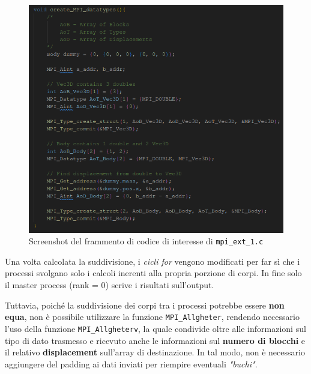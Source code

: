 \documentclass[12pt]{report}
\begin{document}
    \begin{figure}[H]
        \centering
        \includegraphics[width=\textwidth]{images/mpi_ext_1_2.png}
        \caption{Screenshot del frammento di codice di interesse di \texttt{mpi\_ext\_1.c}}
        \label{fig:mpi_ext_1_2}
    \end{figure}

    Una volta calcolata la suddivisione, i \textit{cicli for} vengono modificati per far sì che i processi svolgano solo i calcoli inerenti alla propria porzione di corpi. In fine solo il master process (rank = 0) scrive i risultati sull'output.

    Tuttavia, poiché la suddivisione dei corpi tra i processi potrebbe essere \textbf{non equa}, non è possibile utilizzare la funzione \texttt{MPI\_Allgheter}, rendendo necessario l'uso della funzione \texttt{MPI\_Allgheterv}, la quale condivide oltre alle informazioni sul tipo di dato trasmesso e ricevuto anche le informazioni sul \textbf{numero di blocchi} e il relativo \textbf{displacement} sull'array di destinazione. In tal modo, non è necessario aggiungere del padding ai dati inviati per riempire eventuali \textit{"buchi"}.
\end{document}
